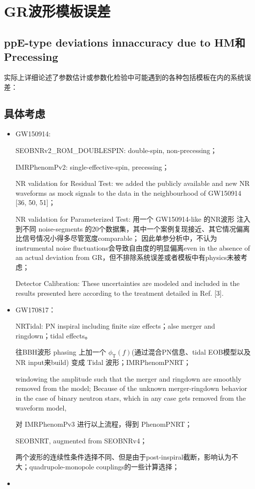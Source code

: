 \documentclass[CJK]{paper}  %
\begin{document}
\section{GR波形模板误差}

\subsection{ppE-type deviations innaccuracy due to HM和Precessing}
\par 实际上详细论述了参数估计或参数化检验中可能遇到的各种包括模板在内的系统误差：\cite{systematic_bias_precession_HM}

\subsection{具体考虑}
\begin{itemize}
	\item[1. ] GW150914\cite{test_GR_GW150914}: 
		
		\par SEOBNRv2\_ROM\_DOUBLESPIN: double-spin, non-precessing；
		\par IMRPhenomPv2: single-effective-spin, precessing；
		\par NR validation for Residual Test: we added the publicly available and new NR waveforms as mock signals to the data in the neighbourhood of GW150914 [36, 50, 51]；
		\par NR validation for Parameterized Test: 用一个 GW150914-like 的NR波形
			注入到不同 noise-segments 的20个数据集，其中一个案例复现接近、其它情况偏离比信号情况小得多尽管宽度comparable；
			因此单参分析中，不认为 instrumental noise fluctuations会导致自由度的明显偏离even in the absence of an actual deviation from GR，但不排除系统误差或者模板中有physics未被考虑；
		\par Detector Calibration: These uncertainties are modeled and included in the results presented here according to the treatment detailed in Ref. [3].
	\item[2. ] GW170817\cite{test_GR_GW170817}：
		\par NRTidal: PN inspiral including finite size effects；alse merger and ringdown；tidal effects。
		\par 往BBH波形 phasing 上加一个 $\phi_\text{T}(f)$(通过混合PN信息、tidal EOB模型以及NR input来build) 变成 Tidal 波形；IMRPhenomPNRT；
		\par windowing the amplitude such that the merger and ringdown are smoothly removed from the model;
			Because of the unknown merger-ringdown behavior in the case of binary neutron stars, which in any case gets removed from the waveform model,
		\par 对 IMRPhenomPv3 进行以上流程，得到 PhenomPNRT；
		\par SEOBNRT, augmented from SEOBNRv4；
		\par 两个波形的连续性条件选择不同、但是由于post-inspiral截断，影响认为不大；quadrupole-monopole couplings的一些计算选择；
	\item[] 
\end{itemize}
\end{document}
